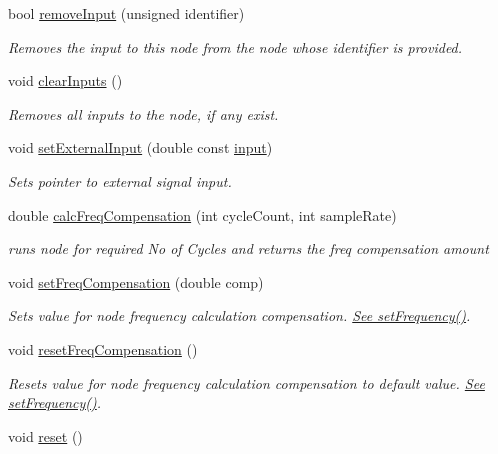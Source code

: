 \begin{DoxyCompactItemize}
bool \hyperlink{classMatsuNode_a70d3d593cb1ebb8a909bfc743867d348}{remove\+Input} (unsigned identifier)
\begin{DoxyCompactList}\small\item\em Removes the input to this node from the node whose identifier is provided. \end{DoxyCompactList}\item 
void \hyperlink{classMatsuNode_a83d81a42f74cadc3f403b65e8b50461e}{clear\+Inputs} ()
\begin{DoxyCompactList}\small\item\em Removes all inputs to the node, if any exist. \end{DoxyCompactList}\item 
void \hyperlink{classMatsuNode_af1538d4e992122d520e221332f05a53e}{set\+External\+Input} (double const \hyperlink{MatsuokaEngine_8cpp_acf1d87f955cfce1c6b5df219f4c6b34a}{input})
\begin{DoxyCompactList}\small\item\em Sets pointer to external signal input. \end{DoxyCompactList}\item 
double \hyperlink{classMatsuNode_a19e5a623c7627ab7f7c94dbd71b67554}{calc\+Freq\+Compensation} (int cycle\+Count, int sample\+Rate)
\begin{DoxyCompactList}\small\item\em runs node for required No of Cycles and returns the freq compensation amount \end{DoxyCompactList}\item 
void \hyperlink{classMatsuNode_a800722180d2d170f80fd61e1db151c05}{set\+Freq\+Compensation} (double comp)
\begin{DoxyCompactList}\small\item\em Sets value for node frequency calculation compensation. \hyperlink{classMatsuNode_adb33b1e7dcfaf786be5d99627bca1c14}{See set\+Frequency()}. \end{DoxyCompactList}\item 
void \hyperlink{classMatsuNode_a131b380ea1f15f19ecc8c3fb4931f6dd}{reset\+Freq\+Compensation} ()
\begin{DoxyCompactList}\small\item\em Resets value for node frequency calculation compensation to default value. \hyperlink{classMatsuNode_adb33b1e7dcfaf786be5d99627bca1c14}{See set\+Frequency()}. \end{DoxyCompactList}\item 
void \hyperlink{classMatsuNode_a233ded2ac8a081385c56d52be06965b5}{reset} ()

\end{DoxyCompactItemize}
